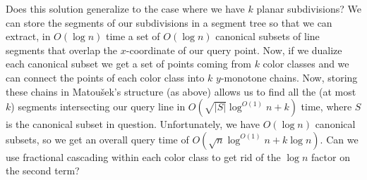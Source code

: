 \documentclass{article}
\newcommand{\polylog}{\log^{O(1)}}
\begin{document}
Does this solution generalize to the case where we have $k$ planar
subdivisions?  We can store the segments of our subdivisions in a
segment tree so that we can extract, in $O(\log n)$ time a set of
$O(\log n)$ canonical subsets of line segments that overlap the
$x$-coordinate of our query point.  Now, if we dualize each canonical
subset we get a set of points coming from $k$ color classes and we can
connect the points of each color class into $k$ $y$-monotone chains.
Now, storing these chains in Matou\v{s}ek's structure (as above)
allows us to find all the (at most $k$) segments intersecting our
query line in $O(\sqrt{|S|}\polylog n + k)$ time, where $S$ is the
canonical subset in question.  Unfortunately, we have $O(\log n)$
canonical subsets, so we get an overall query time of
$O(\sqrt{n}\polylog n + k\log n)$.  Can we use fractional cascading
within each color class to get rid of the $\log n$ factor on the
second term?




\end{document}
